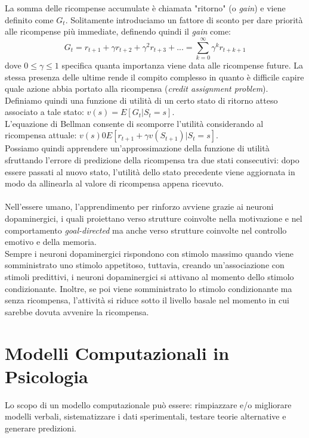 \documentclass[12pt, a4paper]{article}
\begin{document}
La somma delle ricompense accumulate è chiamata "ritorno" (o \textit{gain}) e viene definito come \(G_t\). Solitamente introduciamo un fattore di sconto per dare priorità alle ricompense più immediate, definendo quindi il \textit{gain} come:
\[G_t = r_{t+1} + \gamma r_{t+2} + \gamma^2 r_{t+3} + ... = \sum_{k=0}^\infty \gamma^k r_{t+k+1}\]
dove \(0 \leq \gamma \leq 1 \) specifica quanta importanza viene data alle ricompense future. La stessa presenza delle ultime rende il compito complesso in quanto è difficile capire quale azione abbia portato alla ricompensa (\textit{credit assignment problem}).\\
Definiamo quindi una funzione di utilità di un certo stato di ritorno atteso associato a tale stato: \(v(s) = E[G_t | S_t = s]\). \\
L'equazione di Bellman consente di scomporre l'utilità considerando al ricompensa attuale: \(v(s) 0 E[r_{t+1} + \gamma v(S_{t+1}) | S_t = s]\).\\
Possiamo quindi apprendere un'approssimazione della funzione di utilità sfruttando l'errore di predizione della ricompensa tra due stati consecutivi: dopo essere passati al nuovo stato, l'utilità dello stato precedente viene aggiornata in modo da allinearla al valore di ricompensa appena ricevuto.\\
\\
Nell'essere umano, l'apprendimento per rinforzo avviene grazie ai neuroni dopaminergici, i quali proiettano verso strutture coinvolte nella motivazione e nel comportamento \textit{goal-directed} ma anche verso strutture coinvolte nel controllo emotivo e della memoria.\\
Sempre i neuroni dopaminergici rispondono con stimolo massimo quando viene somministrato uno stimolo appetitoso, tuttavia, creando un'associazione con stimoli predittivi, i neuroni dopaminergici si attivano al momento dello stimolo condizionante. Inoltre, se poi viene somministrato lo stimolo condizionante ma senza ricompensa, l'attività si riduce sotto il livello basale nel momento in cui sarebbe dovuta avvenire la ricompensa.\\

\section{Modelli Computazionali in Psicologia}
Lo scopo di un modello computazionale può essere: rimpiazzare e/o migliorare modelli verbali, sistematizzare i dati sperimentali, testare teorie alternative e generare predizioni.
\end{document}

